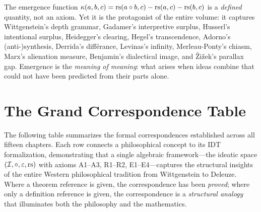 \begin{remark}
The emergence function $\kappa(a,b,c) = \mathrm{rs}(a \circ b, c) - \mathrm{rs}(a,c) - \mathrm{rs}(b,c)$
is a \emph{defined} quantity, not an axiom. Yet it is the protagonist of the
entire volume: it captures Wittgenstein's depth grammar, Gadamer's
interpretive surplus, Husserl's intentional surplus, Heidegger's clearing,
Hegel's transcendence, Adorno's (anti-)synthesis, Derrida's diff\'erance,
Levinas's infinity, Merleau-Ponty's chiasm, Marx's alienation measure,
Benjamin's dialectical image, and \v{Z}i\v{z}ek's parallax gap. Emergence
is the \emph{meaning of meaning}: what arises when ideas combine that could
not have been predicted from their parts alone.
\end{remark}

\section{The Grand Correspondence Table}

The following table summarizes the formal correspondences established
across all fifteen chapters. Each row connects a philosophical concept to
its IDT formalization, demonstrating that a single algebraic framework---the
ideatic space $(\mathcal{I}, \circ, \varepsilon, \mathrm{rs})$ with axioms A1--A3, R1--R2,
E1--E4---captures the structural insights of the entire Western philosophical
tradition from Wittgenstein to Deleuze. Where a theorem reference is given,
the correspondence has been \emph{proved}; where only a definition reference
is given, the correspondence is a \emph{structural analogy} that illuminates
both the philosophy and the mathematics.

